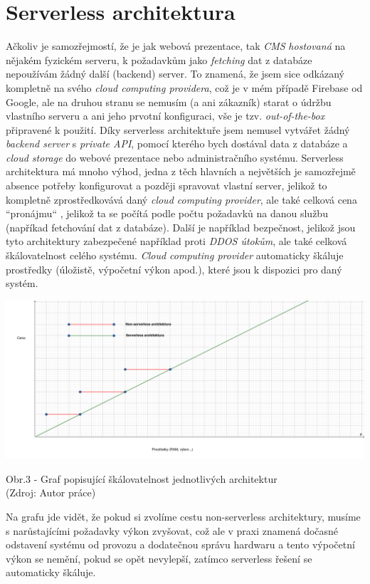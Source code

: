 \documentclass[12pt,a4paper]{report}
\begin{document}
  \section{Serverless architektura}
  Ačkoliv je samozřejmostí, že je jak webová prezentace, tak \emph{CMS} \emph{hostovaná} na nějakém fyzickém
  serveru, k požadavkům jako \emph{fetching} dat z databáze nepoužívám žádný další (backend) server. To
  znamená, že jsem sice odkázaný kompletně na svého \emph{cloud computing providera}, což je v mém
  případě Firebase od Google, ale na druhou stranu se nemusím (a ani zákazník) starat o údržbu
  vlastního serveru a ani jeho prvotní konfiguraci, vše je tzv. \emph{out-of-the-box} připravené k použití.
  Díky serverless architektuře jsem nemusel vytvářet žádný \emph{backend server} s \emph{private API}, pomocí
  kterého bych dostával data z databáze a \emph{cloud storage} do webové prezentace nebo
  administračního systému.
  Serverless architektura má mnoho výhod, jedna z těch hlavních a největších je samozřejmě
  absence potřeby konfigurovat a později spravovat vlastní server, jelikož to kompletně
  zprostředkovává daný \emph{cloud computing provider}, ale také celková cena ``pronájmu`` , jelikož ta se
  počítá podle počtu požadavků na danou službu (napříkad fetchování dat z databáze). Další je například bezpečnost,
  jelikož jsou tyto architektury zabezpečené například proti \emph{DDOS útokům}, ale také celková
  škálovatelnost celého systému. \emph{Cloud computing provider} automaticky škáluje prostředky (úložistě,
  výpočetní výkon apod.), které jsou k dispozici pro daný systém.

  \vspace*{0.5cm}
  \noindent\includegraphics[width=\linewidth]{non-vs-serverless.png}
  \begin{center}
    Obr.3 - Graf popisující škálovatelnost jednotlivých architektur  \\
    (Zdroj: Autor práce)
  \end{center}
  \vspace*{0.5cm}
  Na grafu jde vidět, že pokud si zvolíme cestu non-serverless architektury, musíme s narůstajícími
  požadavky výkon zvyšovat, což ale v praxi znamená dočasné odstavení systému od provozu a
  dodatečnou správu hardwaru a tento výpočetní výkon se nemění, pokud se opět nevylepší,
  zatímco serverless řešení se automaticky škáluje.
  
\end{document}
